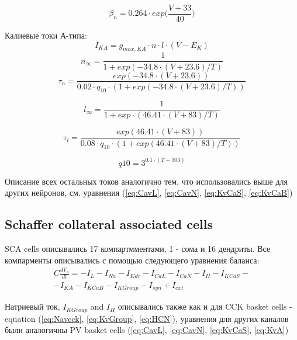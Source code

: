 \documentclass[a4paper,12pt]{article}
\begin{document}
\begin{equation}
\beta_n = 0.264 \cdot exp \Big( \frac{V + 33}{40} \Big)
\end{equation}

Калиевые токи А-типа:
\begin{equation}
I_{KA} = g_{max, KA} \cdot n \cdot l \cdot (V - E_K)
\end{equation}
\begin{equation}
n_{\infty} = \frac{1}{1 + exp(-34.8 \cdot (V + 23.6)/T)}
\end{equation}
\begin{equation}
\tau_n = \frac{exp(-34.8 \cdot (V + 23.6)) }
{0.02 \cdot q_{10} \cdot (1 + exp(-34.8 \cdot (V + 23.6)/T))}
\end{equation}

\begin{equation}
l_{\infty} = \frac{1}{1 + exp \cdot (46.41\cdot (V + 83)/T)}
\end{equation}

\begin{equation}
\tau_l = \frac{exp(46.41\cdot (V + 83)) }
{0.08 \cdot q_{10} \cdot (1 + exp(46.41\cdot (V + 83)/T))}
\end{equation}

\begin{equation}
q10 = 3^{0.1\cdot (T - 303) } 
\end{equation}

Описание всех остальных токов аналогично тем, что использовались выше для других нейронов, см. уравнения (\ref{eq:CavL}, \ref{eq:CavN}, \ref{eq:KvCaS}, \ref{eq:KvCaB})

\subsection{Schaffer collateral associated cells}
SCA cells описывались 17 компартмментами, 1 - сома и 16 дендриты. Все компарменты описывались с помощью следующего уравнения баланса:
\begin{eqnarray}
C\frac{dV_s}{dt}=-I_L-I_{Na}-I_{Kdr}-I_{CaL}-I_{CaN}-I_{H}-I_{KCaS}- \nonumber \\ -I_{KA}-I_{KCaB}-I_{KGroup}-I_{syn} + I_{ext}
\end{eqnarray}

Натриевый ток, $I_{KGroup}$ and $I_{H}$ описывались также как и для CCK basket cells - equation  (\ref{eq:Navcck}, \ref{eq:KvGroup}, \ref{eq:HCN}), уравнения для других каналов были аналогичны PV basket cells  (\ref{eq:CavL}, \ref{eq:CavN}, \ref{eq:KvCaS}, \ref{eq:KvA})
\end{document}
